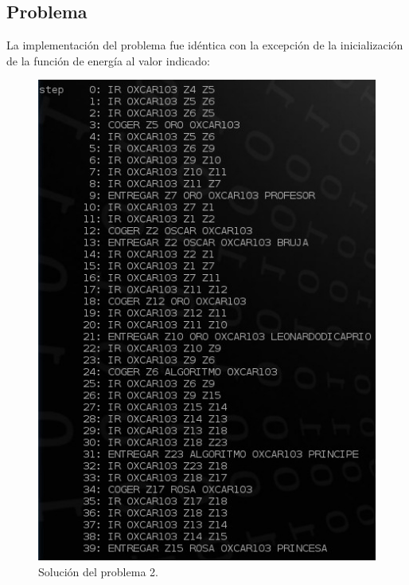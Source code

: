 \documentclass[a4paper, 11pt]{article}
\begin{document}
	\subsection{Problema}
		La implementación del problema fue idéntica con la excepción de la inicialización de la función de
		energía al valor indicado:
		\begin{figure}[H]
			\centering
			\includegraphics[width=15cm]{Problema2.jpg}
			\caption{Solución del problema 2.}
			\label{Prob-2}
		\end{figure}
\end{document}
